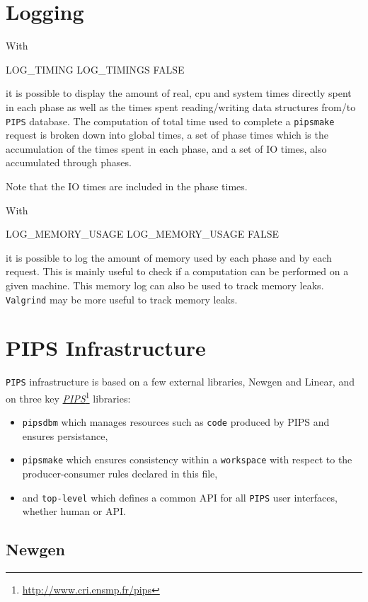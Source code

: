 \documentclass[a4paper]{report}
\newcommand{\LINK}[2]{\href{#2}{#1}\footnote{\url{#2}}\xspace}
\newcommand{\Pips}{\texttt{PIPS}}
\newcommand{\PIPS}{\LINK{\emph{PIPS}}{http://www.cri.ensmp.fr/pips}}
\newcommand{\Pipsmake}{\texttt{pipsmake}}
\begin{document}
\section{Logging}

With
\begin{PipsProp}{LOG_TIMING}
LOG_TIMINGS FALSE
\end{PipsProp}
it is possible to display the amount of real, cpu and system times
directly spent in each phase as well as the times spent
reading/writing data structures from/to {\tt PIPS} database. The computation
of total time used to complete a \Pipsmake{} request is broken down into
global times, a set of phase times which is the accumulation of the
times spent in each phase, and a set of IO times, also accumulated
through phases.

Note that the IO times are included in the phase times.

With
\begin{PipsProp}{LOG_MEMORY_USAGE}
LOG_MEMORY_USAGE FALSE
\end{PipsProp}
it is possible to log the amount of memory used by each phase and by
each request. This is mainly useful to check if a computation can be
performed on a given machine. This memory log can also be used to
track memory leaks. {\tt Valgrind} may be more useful to track memory
leaks.

\section{PIPS Infrastructure}
\label{section-pips-infrastructure}

\Pips{} infrastructure is based on a few external libraries, Newgen
and Linear, and on three key \PIPS libraries:
\begin{itemize}
\item \verb/pipsdbm/ which manages resources such as \verb/code/
  produced by PIPS and ensures persistance,
\item \verb/pipsmake/ which ensures consistency within a
  \verb/workspace/ with respect to the producer-consumer rules
  declared in this file,
\item and \verb/top-level/ which defines a common API for all \Pips{}
  user interfaces, whether human or API.
\end{itemize}

\subsection{Newgen}
\end{document}
